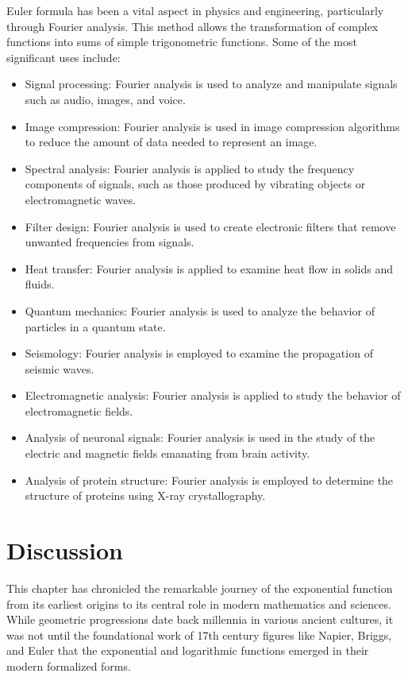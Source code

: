 Euler formula has been a vital aspect in physics and engineering, particularly through Fourier analysis. This method allows the transformation of complex functions into sums of simple trigonometric functions. Some of the most significant uses include:
\begin{itemize}
    \item Signal processing: Fourier analysis is used to analyze and manipulate signals such as audio, images, and voice.
    \item Image compression: Fourier analysis is used in image compression algorithms to reduce the amount of data needed to represent an image.
    \item Spectral analysis: Fourier analysis is applied to study the frequency components of signals, such as those produced by vibrating objects or electromagnetic waves.
    \item Filter design: Fourier analysis is used to create electronic filters that remove unwanted frequencies from signals.
    \item Heat transfer: Fourier analysis is applied to examine heat flow in solids and fluids.
    \item Quantum mechanics: Fourier analysis is used to analyze the behavior of particles in a quantum state.
    \item Seismology: Fourier analysis is employed to examine the propagation of seismic waves.
    \item Electromagnetic analysis: Fourier analysis is applied to study the behavior of electromagnetic fields.
    \item Analysis of neuronal signals: Fourier analysis is used in the study of the electric and magnetic fields emanating from brain activity.
    \item Analysis of protein structure: Fourier analysis is employed to determine the structure of proteins using X-ray crystallography.
\end{itemize}

\section{Discussion}

This chapter has chronicled the remarkable journey of the exponential function from its earliest origins to its central role in modern mathematics and sciences. While geometric progressions date back millennia in various ancient cultures, it was not until the foundational work of 17th century figures like Napier, Briggs, and Euler that the exponential and logarithmic functions emerged in their modern formalized forms.

